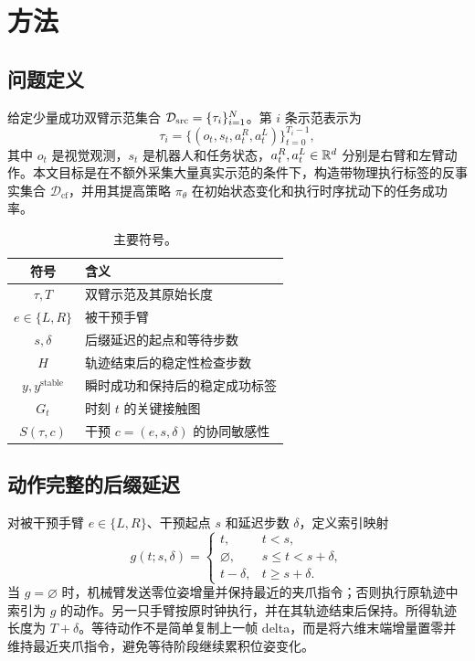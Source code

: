 \section{方法}
\label{sec:method}

\subsection{问题定义}

给定少量成功双臂示范集合 $\mathcal{D}_{\mathrm{src}}=\{\tau_i\}_{i=1}^{N}$。第 $i$ 条示范表示为
\begin{equation}
\tau_i=\{(o_t,s_t,a_t^R,a_t^L)\}_{t=0}^{T_i-1},
\end{equation}
其中 $o_t$ 是视觉观测，$s_t$ 是机器人和任务状态，$a_t^R,a_t^L\in\mathbb{R}^{d}$ 分别是右臂和左臂动作。本文目标是在不额外采集大量真实示范的条件下，构造带物理执行标签的反事实集合 $\mathcal{D}_{\mathrm{cf}}$，并用其提高策略 $\pi_\theta$ 在初始状态变化和执行时序扰动下的任务成功率。

\begin{table}[t]
\centering
\caption{主要符号。}
\label{tab:notation}
\begin{tabular}{cl}
\toprule
符号 & 含义 \\
\midrule
$\tau,T$ & 双臂示范及其原始长度 \\
$e\in\{L,R\}$ & 被干预手臂 \\
$s,\delta$ & 后缀延迟的起点和等待步数 \\
$H$ & 轨迹结束后的稳定性检查步数 \\
$y,y^{\mathrm{stable}}$ & 瞬时成功和保持后的稳定成功标签 \\
$G_t$ & 时刻 $t$ 的关键接触图 \\
$S(\tau,c)$ & 干预 $c=(e,s,\delta)$ 的协同敏感性 \\
\bottomrule
\end{tabular}
\end{table}

\subsection{动作完整的后缀延迟}

对被干预手臂 $e\in\{L,R\}$、干预起点 $s$ 和延迟步数 $\delta$，定义索引映射
\begin{equation}
g(t;s,\delta)=
\begin{cases}
t, & t<s,\\
\varnothing, & s\le t<s+\delta,\\
t-\delta, & t\ge s+\delta.
\end{cases}
\end{equation}
当 $g=\varnothing$ 时，机械臂发送零位姿增量并保持最近的夹爪指令；否则执行原轨迹中索引为 $g$ 的动作。另一只手臂按原时钟执行，并在其轨迹结束后保持。所得轨迹长度为 $T+\delta$。等待动作不是简单复制上一帧 delta，而是将六维末端增量置零并维持最近夹爪指令，避免等待阶段继续累积位姿变化。

